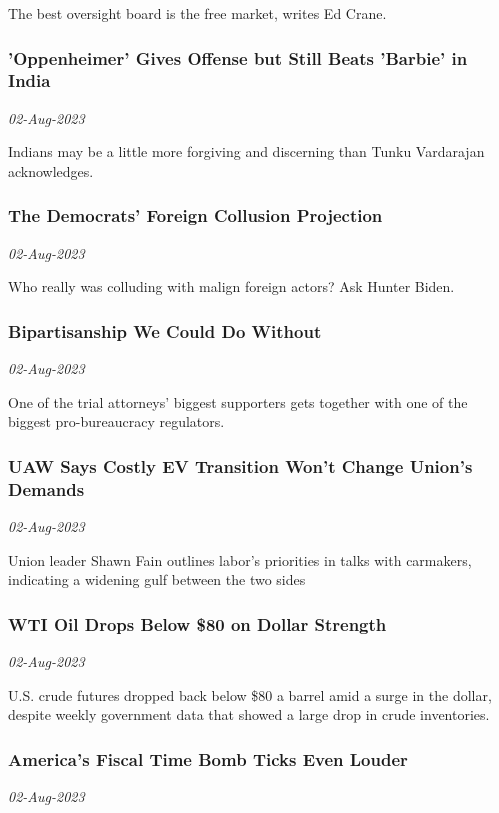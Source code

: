The best oversight board is the free market, writes Ed Crane.
\subsubsection{'Oppenheimer' Gives Offense but Still Beats 'Barbie' in India \href{https://www.wsj.com/articles/oppenheimer-india-hindu-offensive-bhagavad-gita-sales-44b248b1}{}}
\textit{02-Aug-2023}

Indians may be a little more forgiving and discerning than Tunku Vardarajan acknowledges.
\subsubsection{The Democrats' Foreign Collusion Projection \href{https://www.wsj.com/articles/hunter-biden-trump-democrats-collusion-8bcfa66e}{}}
\textit{02-Aug-2023}

Who really was colluding with malign foreign actors? Ask Hunter Biden.
\subsubsection{Bipartisanship We Could Do Without \href{https://www.wsj.com/articles/bipartisan-warren-graham-internet-regulator-98008f0b}{}}
\textit{02-Aug-2023}

One of the trial attorneys’ biggest supporters gets together with one of the biggest pro-bureaucracy regulators.
\subsubsection{UAW Says Costly EV Transition Won't Change Union's Demands \href{https://www.wsj.com/articles/uaw-says-costly-ev-transition-wont-change-unions-demands-1561a725}{}}
\textit{02-Aug-2023}

Union leader Shawn Fain outlines labor’s priorities in talks with carmakers, indicating a widening gulf between the two sides
\subsubsection{WTI Oil Drops Below \$80 on Dollar Strength \href{https://www.wsj.com/articles/oil-prices-gain-amid-supply-tightness-easing-macro-pressure-dd891c4f}{}}
\textit{02-Aug-2023}

U.S. crude futures dropped back below \$80 a barrel amid a surge in the dollar, despite weekly government data that showed a large drop in crude inventories.
\subsubsection{America's Fiscal Time Bomb Ticks Even Louder \href{https://www.wsj.com/articles/americas-fiscal-time-bomb-ticks-even-louder-e2934f65}{}}
\textit{02-Aug-2023}

